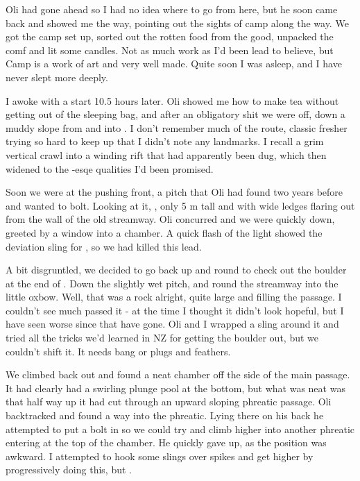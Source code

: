 Oli had gone ahead so I had no idea where to go from here, but he soon came back and showed me the way, pointing out the sights of camp  along the way. We got the camp set up, sorted out the rotten food from the good, unpacked the comf and lit some candles. Not as much work as I'd been lead to believe, but Camp  is a work of art and very well made. Quite soon I was asleep, and I have never slept more deeply.

I awoke with a start 10.5 hours later. Oli showed me how to make tea without getting out of the sleeping bag, and after an obligatory shit we were off, down a muddy slope from  and into . I don't remember much of the route, classic fresher trying so hard to keep up that I didn't note any landmarks. I recall a grim vertical crawl into a winding rift that had apparently been dug, which then widened to the -esqe qualities I'd been promised.

Soon we were at the pushing front, a pitch that Oli had found two years before and wanted to bolt. Looking at it, , only 5 m tall and with wide ledges flaring out from the wall of the old streamway. Oli concurred and we were quickly down, greeted by a window into a chamber. A quick flash of the light showed the deviation sling for , so we had killed this lead. 

A bit disgruntled, we decided to go back up and round to check out the boulder at the end of . Down the slightly wet pitch, and round the streamway into the little oxbow. Well, that was a rock alright, quite large and filling the passage. I couldn't see much passed it - at the time I thought it didn't look hopeful, but I have seen worse since that have gone. Oli and I wrapped a sling around it and tried all the tricks we'd learned in NZ for getting the boulder out, but we couldn't shift it. It needs bang or plugs and feathers.

We climbed back out and found a neat chamber off the side of the main passage. It had clearly had a swirling plunge pool at the bottom, but what was neat was that half way up it had cut through an upward sloping phreatic passage. Oli backtracked and found a way into the phreatic. Lying there on his back he attempted to put a bolt in so we could try and climb higher into another phreatic entering at the top of the chamber. He quickly gave up, as the position was awkward. I attempted to hook some slings over spikes and get higher by progressively doing this, but .

